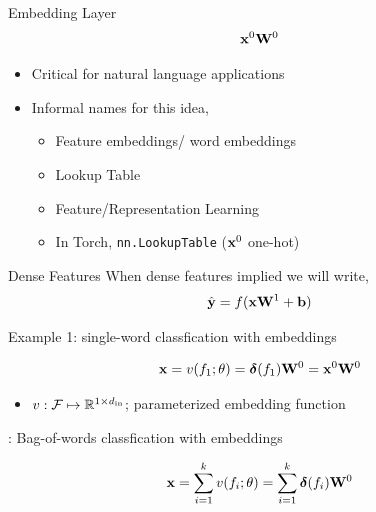 \documentclass{beamer}
\begin{document}
\begin{frame}{Embedding Layer}
  \[ \mathbf{x}^0 \mathbf{W}^0\]
  \begin{center}

  \end{center}
  \begin{itemize}
  \item Critical for natural language applications
  \item Informal names for this idea,
    \begin{itemize}
    \item Feature embeddings/ word embeddings
    \item Lookup Table
    \item Feature/Representation Learning
    \item In Torch, \texttt{nn.LookupTable} ($\mathbf{x}^0$ one-hot)
    \end{itemize}
  \end{itemize}
\end{frame}

\begin{frame}{Dense Features}
  When dense features implied we will write,
  \[\hat{\mathbf{y}} = f(\mathbf{x}\mathbf{W}^1 + \mathbf{b})\]


  Example 1: single-word classfication with embeddings

  \[ \mathbf{x} = v(f_1; \theta) = \boldsymbol{\delta}(f_1) \mathbf{W}^0 = \mathbf{x}^0 \mathbf{W}^0\]

  \begin{itemize}
  \item $v: \mathcal{F} \mapsto \mathbb{R}^{1\times {d_{\mathrm{in}}}}$; parameterized embedding function
  \end{itemize}


  \pause
  : Bag-of-words classfication with embeddings

  \[ \mathbf{x} = \sum_{i=1}^{k} v(f_i; \theta) = \sum_{i=1}^{k} \boldsymbol{\delta}(f_i) \mathbf{W}^0\]
\end{frame}
\end{document}
